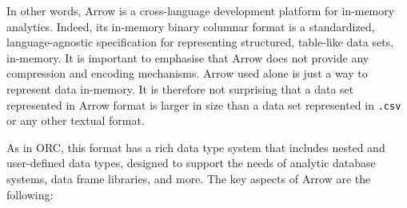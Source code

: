 \documentclass[10pt, a4paper]{report}
\begin{document}
In other words, Arrow is a cross-language development platform for in-memory analytics\cite{arrow_homepage}. Indeed, its in-memory binary columnar format is a standardized, language-agnostic specification for representing structured, table-like data sets, in-memory. It is important to emphasise that Arrow does not provide any compression and encoding mechanisms. Arrow used alone is just a way to represent data in-memory. It is therefore not surprising that a data set represented in Arrow format is larger in size than a data set represented in \texttt{.csv} or any other textual format.

As in ORC, this format has a rich data type system that includes nested and user-defined data types, designed to support the needs of analytic database systems, data frame libraries, and more\cite{arrow_overview}. The key aspects of Arrow are the following: \\
\end{document}
